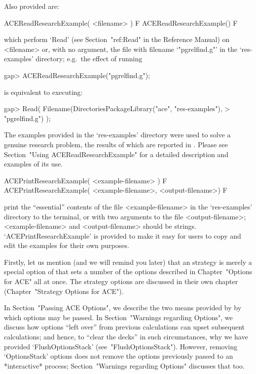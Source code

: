 Also provided are:

\> ACEReadResearchExample( <filename> ) F
\> ACEReadResearchExample() F

which perform `Read' (see Section~"ref:Read" in the  {\GAP}  Reference
Manual) on <filename> or, with no argument,  the  file  with  filename
`"pgrelfind.g"' in the `res-examples' directory;  e.g.~the  effect  of
running

\beginexample
gap> ACEReadResearchExample("pgrelfind.g");
\endexample

is equivalent to executing:

\beginexample
gap> Read( Filename(DirectoriesPackageLibrary("ace", "res-examples"),
>                   "pgrelfind.g") );
\endexample

The examples provided in the `res-examples'  directory  were  used  to
solve a genuine research problem, the results of which are reported in
\cite{CHHR01}. Please see Section~"Using  ACEReadResearchExample"  for
a detailed description and examples of its use.

\> ACEPrintResearchExample( <example-filename> ) F
\> ACEPrintResearchExample( <example-filename>, <output-filename>) F

print the ``essential'' contents of the file <example-filename> in the
`res-examples' directory to the terminal, or with two arguments to the
file  <output-filename>;  <example-filename>   and   <output-filename>
should be strings. `ACEPrintResearchExample' is provided  to  make  it
easy for users to copy and edit the examples for their own purposes.


Firstly, let us mention (and we will remind you later) that an  {\ACE}
strategy is merely a special option of {\ACE} that sets  a  number  of
the options described in Chapter~"Options for ACE" all  at  once.  The
strategy options are discussed in their own chapter (Chapter~"Strategy
Options for ACE").

In Section~"Passing ACE Options", we describe the two  means  provided
by {\GAP} by which {\ACE} options may be passed. In  Section~"Warnings
regarding Options", we discuss how options ``left over'' from previous
calculations can upset subsequent calculations; and hence, to  ``clear
the  decks''   in   such   circumstances,   why   we   have   provided
`FlushOptionsStack'   (see~"FlushOptionsStack").   However,   removing
`OptionsStack' options does not remove the options  previously  passed
to  an  *interactive*  {\ACE}  process;  Section~"Warnings   regarding
Options" discusses that too.

